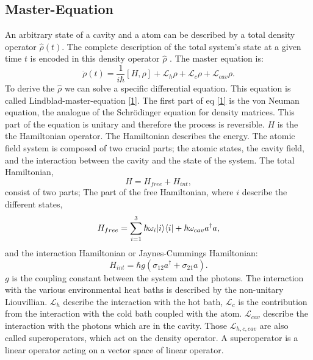 \documentclass[12pt,a4paper]{article}
\DeclarePairedDelimiter\bra{\langle}{\rvert}
\DeclarePairedDelimiter\ket{\lvert}{\rangle}
\begin{document}
\subsection{Master-Equation} 
An arbitrary state of a cavity and a atom can be described by a total density operator $\hat{\rho}(t)$. %
The complete description of the total system's state at a given time $t$ is encoded in this density 
operator $\hat{\rho}$ \cite{Li2017}.
The master equation is:
\begin{equation}
\dot{\rho}(t)=\frac{1}{i \hbar}[H,\rho]+ \mathcal{L}_{h}\rho+ \mathcal{L}_{c}\rho+ \mathcal{L}_{cav}\rho. \label{1}
\end{equation}
To derive the $\hat{\rho}$ we can solve a specific differential equation. This equation is called Lindblad-master-equation \eqref{1}. 
The first part of eq \eqref{1} is the von Neuman equation,  the analogue of the Schrödinger equation for density matrices. This part of the equation is unitary and therefore the process is reversible.
$H$ is the the Hamiltonian operator. 
The Hamiltonian describes the energy. 
The atomic field system is composed of two crucial 
parts; the atomic states, the cavity field, and the interaction between the cavity and the state of the system.
The total Hamiltonian,
\begin{equation}
H=H_{free}+H_{int},
\end{equation}
consist of two parts; The part of the free Hamiltonian, where $i$ describe the different states,
\begin{equation}
H_{free}=\sum_{i=1}^3 \hbar \omega_i \ket{i}\bra{i}+\hbar \omega_{cav} a^{\dag}a,\label{2}
\end{equation}
and the interaction Hamiltonian or Jaynes-Cummings Hamiltonian:
\begin{equation}
H_{int}=\hbar g(\sigma_{12}a^{\dag}+\sigma_{21}a).\label{3}
\end{equation}
$g$ is the coupling constant between the system and the photons.  
\newpage
The interaction with the various environmental heat baths is described by the non-unitary Liouvillian. $\mathcal{L}_h$ describe the interaction with the hot bath, $\mathcal{L}_c$ is the contribution from the interaction with the cold bath coupled with the atom.  $\mathcal{L}_{cav}$ describe the interaction with the photons which are in the cavity.  Those $\mathcal{L}_{h,c,cav}$ are also called superoperators, which act on the density operator.  A superoperator is a linear operator acting on a vector space of linear operator. 
\end{document}
